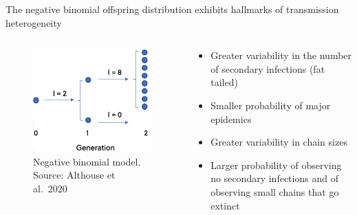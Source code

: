 \documentclass[
  ignorenonframetext,
]{beamer}
\begin{document}
\begin{frame}{The negative binomial offspring distribution exhibits
hallmarks of transmission heterogeneity}
\protect\hypertarget{the-negative-binomial-offspring-distribution-exhibits-hallmarks-of-transmission-heterogeneity}{}
\begin{columns}[T]
\begin{column}{0.4\textwidth}
\begin{figure}
\centering
\includegraphics{Althouseetal2020BranchingProcess.png}
\caption{Negative binomial model. Source: Althouse et al.~2020}
\end{figure}
\end{column}

\begin{column}{0.6\textwidth}
\begin{itemize}
\item Greater variability in the number of secondary infections (fat tailed)
\item Smaller probability of major epidemics
\item Greater variability in chain sizes
\item Larger probability of observing no secondary infections and of observing small chains that go extinct
\end{itemize}
\end{column}
\end{columns}
\end{frame}
\end{document}
